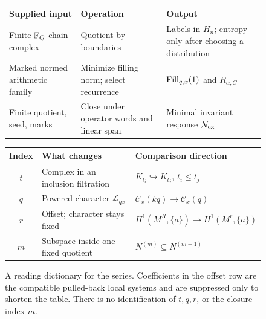 \begin{figure}[htbp]
\centering
{}
\begin{tabular}{@{}>{\raggedright\arraybackslash}p{.27\linewidth}
 >{\raggedright\arraybackslash}p{.30\linewidth}
 >{\raggedright\arraybackslash}p{.34\linewidth}@{}}
\toprule
Supplied input & Operation & Output\\\midrule
Finite $\mathbb F_Q$ chain complex & Quotient by boundaries & Labels in $H_n$; entropy only after choosing a distribution\\[4pt]
Marked normed arithmetic family & Minimize filling norm; select recurrence & $\operatorname{Fill}_{q,x}(1)$ and $R_{\alpha,C}$\\[4pt]
Finite quotient, seed, marks & Close under operator words and linear span & Minimal invariant response $\mathcal N_{\mathrm{ex}}$\\
\bottomrule
\end{tabular}
\medskip
{}
\begin{tabular}{@{}cll@{}}
\toprule
Index & What changes & Comparison direction\\\midrule
$t$ & Complex in an inclusion filtration & $K_{t_i}\hookrightarrow K_{t_j}$, $t_i\leq t_j$\\[3pt]
$q$ & Powered character $\mathcal L_{qx}$ & $\mathcal C_x(kq)\longrightarrow\mathcal C_x(q)$\\[3pt]
$r$ & Offset; character stays fixed & $H^1(M^R,\{a\})\longrightarrow H^1(M^r,\{a\})$\\[3pt]
$m$ & Subspace inside one fixed quotient & $N^{(m)}\subseteq N^{(m+1)}$\\
\bottomrule
\end{tabular}
\caption{A reading dictionary for the series. Coefficients in the offset
row are the compatible pulled-back local systems and are suppressed only
to shorten the table. There is no identification of $t,q,r$, or the
closure index $m$.}
\label{fig:series-dictionary}
\end{figure}